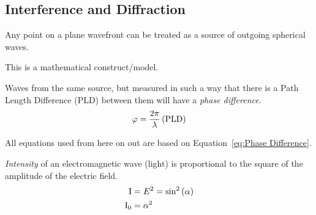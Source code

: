 \subsection{Interference and Diffraction}\label{subsec:Interference and Diffraction}
\begin{definition}\label{def:Huygen's Principle}
  Any point on a plane wavefront can be treated as a source of outgoing spherical waves.
  \begin{note}
    This is a mathematical construct/model.
  \end{note}
\end{definition}
\begin{definition}\label{def:Phase Difference}
  Waves from the same source, but measured in such a way that there is a Path Length Difference (PLD) between them will have a \emph{phase difference}.
  \begin{equation}\label{eq:Phase Difference}
    \varphi = \frac{2 \pi}{\lambda} \left( \operatorname{\text{PLD}} \right)
  \end{equation}
\end{definition}
All  equations used from here on out are based on Equation~\eqref{eq:Phase Difference}.
\begin{definition}[Intensity]\label{def:Intensity}
  \emph{Intensity} of an electromagnetic wave (light) is proportional to the square of the amplitude of the electric field.
  \begin{equation}\label{eq:Intensity}
    \begin{aligned}
      \operatorname{I} &= E^{2} = \sin^{2} \left( \alpha \right) \\
      \operatorname{I}_{0} &= \alpha^{2} \\
    \end{aligned}
  \end{equation}
\end{definition}

